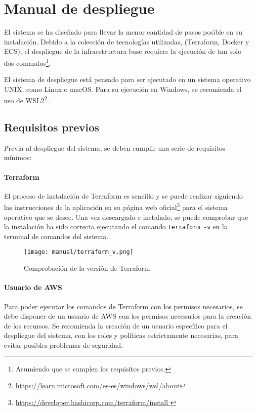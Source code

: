 \section{Manual de despliegue}\label{sec:manual_despliegue}
El sistema se ha diseñado para llevar la menor cantidad de pasos posible en su
instalación. Debido a la colección de tecnologías utilizadas, (Terraform,
Docker y ECS), el despliegue de la infraestructura base requiere la ejecución de
tan solo dos comandos\footnote{Asumiendo que se cumplen los requisitos previos.}.

El sistema de despliegue está pensado para ser ejecutado en un sistema operativo
UNIX, como Linux o macOS. Para su ejecución en Windows, se recomienda el uso
de WSL2\footnote{\url{https://learn.microsoft.com/es-es/windows/wsl/about}}.


\subsection{Requisitos previos}
Previa al despliegue del sistema, se deben cumplir una serie de requisitos
mínimos:


\paragraph{Terraform}
El proceso de instalación de Terraform es sencillo y se puede realizar siguiendo
las instrucciones de la aplicación en su página web oficial\footnote{\url{
	https://developer.hashicorp.com/terraform/install
}} para el sistema operativo que se desee. Una vez descargado e instalado,
se puede comprobar que la instalación ha sido correcta ejecutando el comando
\texttt{terraform -v} en la terminal de comandos del sistema.

\begin{figure}[H]
	\centering
	\texttt{[image: manual/terraform\_v.png]}
	\caption{Comprobación de la versión de Terraform}
	\label{fig:terraform_version}
\end{figure}


\newpage{}
\paragraph{Usuario de AWS}
Para poder ejecutar los comandos de Terraform con los permisos necesarios, se
debe disponer de un usuario de AWS con los permisos necesarios para la creación
de los recursos. Se recomienda la creación de un usuario específico para el
despliegue del sistema, con los roles y políticas estrictamente necesarias, para
evitar posibles problemas de seguridad.

